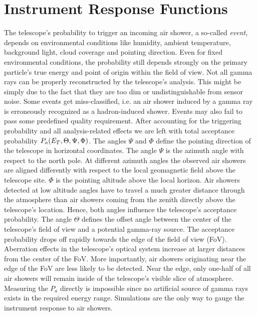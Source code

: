 

\section{Instrument Response Functions}
\label{sec:irf}


The telescope's probability to trigger an incoming air shower, a so-called \emph{event}, depends on environmental conditions like humidity, ambient temperature, 
background light, cloud coverage and pointing direction. Even for fixed environmental conditions, the probability still depends 
strongly on the primary particle's true energy and point of origin within the field of view.
Not all gamma rays can be properly reconstructed by the telescope's analysis.
This might be simply due to the fact that they are too dim or undistinguishable from sensor noise. Some events get miss-classified, i.e. 
an air shower induced by a gamma ray is erroneously recognized as a hadron-induced shower. Events may also 
fail to pass some predefined quality requirement.
After accounting for the triggering probability and all analysis-related effects we are left with total acceptance probability $P_a(E_T, \Theta, \Psi, \Phi)$.
The angles $\Psi$ and $\Phi$ define the pointing direction of the telescope in horizontal coordinates. The angle $\Psi$ is the azimuth angle with respect to the north pole.
At different azimuth angles the observed air showers are aligned differently with respect to the local geomagnetic field above the telescope site.
$\Phi$ is the pointing altitude above the local horizon.
Air showers detected at low altitude angles have to travel a much greater distance through the atmosphere than air showers coming from the 
zenith directly above the telescope's location. Hence, both angles influence the telescope's acceptance probability.
The angle $\Theta$ defines the offset angle between the center of the telescope's field of view and a potential gamma-ray source.
The acceptance probability drops off rapidly towards the edge of the field of view (FoV). 
Aberration effects in the telescope's optical system increase at larger distances from the center of the FoV. 
More importantly, air showers originating near the edge of the FoV are less likely to be detected. Near the edge, only one-half of all air showers will 
remain inside of the telescope's visible slice of atmosphere.
Measuring the $P_a$ directly is impossible since no artificial source of gamma rays exists in the required energy range. 
Simulations are the only way to gauge the instrument response to air showers.
